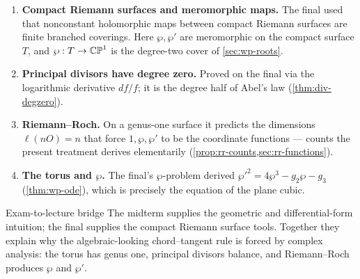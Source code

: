 \begin{enumerate}
\item \textbf{Compact Riemann surfaces and meromorphic maps.} The final used that
nonconstant holomorphic maps between compact Riemann surfaces are finite branched
coverings. Here \(\wp, \wp'\) are meromorphic on the compact surface \(T\), and
\(\wp : T \to \mathbb{CP}^1\) is the degree-two cover of \cref{sec:wp-roots}.

\item \textbf{Principal divisors have degree zero.} Proved on the final via the
logarithmic derivative \(df/f\); it is the degree half of Abel's law
(\cref{thm:div-degzero}).

\item \textbf{Riemann--Roch.} On a genus-one surface it predicts the dimensions
\(\ell(nO) = n\) that force \(1, \wp, \wp'\) to be the coordinate functions ---
counts the present treatment derives elementarily
(\cref{prop:rr-counts,sec:rr-functions}).

\item \textbf{The torus and \(\wp\).} The final's \(\wp\)-problem derived
\(\wp'^2 = 4\wp^3 - g_2\wp - g_3\) (\cref{thm:wp-ode}), which is precisely the
equation of the plane cubic.
\end{enumerate}

\begin{keyidea}{Exam-to-lecture bridge}
The midterm supplies the geometric and differential-form intuition; the final
supplies the compact Riemann surface tools. Together they explain why the
algebraic-looking chord--tangent rule is forced by complex analysis: the torus has
genus one, principal divisors balance, and Riemann--Roch produces \(\wp\) and
\(\wp'\).
\end{keyidea}
